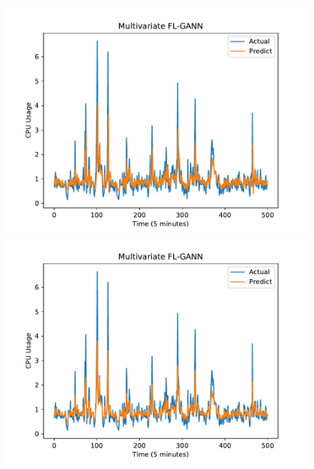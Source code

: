 \documentclass[runningheads]{llncs}
\begin{document}
\begin{figure}[h]
	\centering
	\begin{minipage}[t]{4cm}
		\centering
		\includegraphics[width=1\textwidth =0cm 0cm 0cm 0cm]{images/pdf/multi_cpu_flgann.pdf}
	\end{minipage}
	\begin{minipage}[t]{4cm}
		\centering
		\includegraphics[width=1\textwidth =0cm 0cm 0cm 0cm]{images/pdf/multi_cpu_flbfonn.pdf}
	\end{minipage}
	\begin{minipage}[t]{4cm}
		\centering

\end{minipage}
\end{figure}
\end{document}
